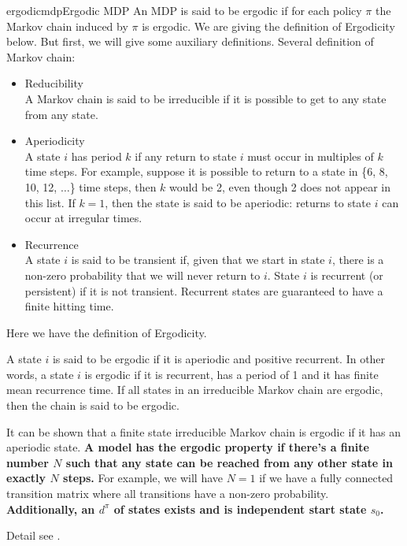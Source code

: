 \documentclass[9pt]{article}
\begin{document}
\begin{topic}{ergodicmdp}{Ergodic MDP}
An MDP is said to be ergodic if for each policy $\pi$ the Markov chain induced by $\pi$ is ergodic.
We are giving the definition of Ergodicity below. But first, we will give some auxiliary definitions.
Several definition of Markov chain:
\begin{itemize}
\item Reducibility\\
A Markov chain is said to be irreducible if it is possible to get to any state from any state.
\item Aperiodicity\\
A state $i$ has period $k$ if any return to state $i$ must occur in multiples of $k$ time steps. For example, suppose it is possible to return to a state in \{6, 8, 10, 12, $\ldots$\} time steps, then $k$ would be 2, even though 2 does not appear in this list. If $k = 1$, then the state is said to be aperiodic: returns to state $i$ can occur at irregular times.
\item Recurrence\\
A state $i$ is said to be transient if, given that we start in state $i$, there is a non-zero probability that we will never return to $i$. State $i$ is recurrent (or persistent) if it is not transient. Recurrent states are guaranteed to have a finite hitting time.
\end{itemize}
Here we have the definition of Ergodicity.

A state $i$ is said to be ergodic if it is aperiodic and positive recurrent. In other words, a state $i$ is ergodic if it is recurrent, has a period of 1 and it has finite mean recurrence time. If all states in an irreducible Markov chain are ergodic, then the chain is said to be ergodic.

It can be shown that a finite state irreducible Markov chain is ergodic if it has an aperiodic state. {\bf A model has the ergodic property if there's a finite number $N$ such that any state can be reached from any other state in exactly $N$ steps.} For example, we will have $N=1$ if we have a fully connected transition matrix where all transitions have a non-zero probability.
{\bf Additionally, an  $d^{\pi}$ of states exists and is independent start state $s_0$.}

Detail see \citep{ortner2007linear}.
\end{topic}
\end{document}
